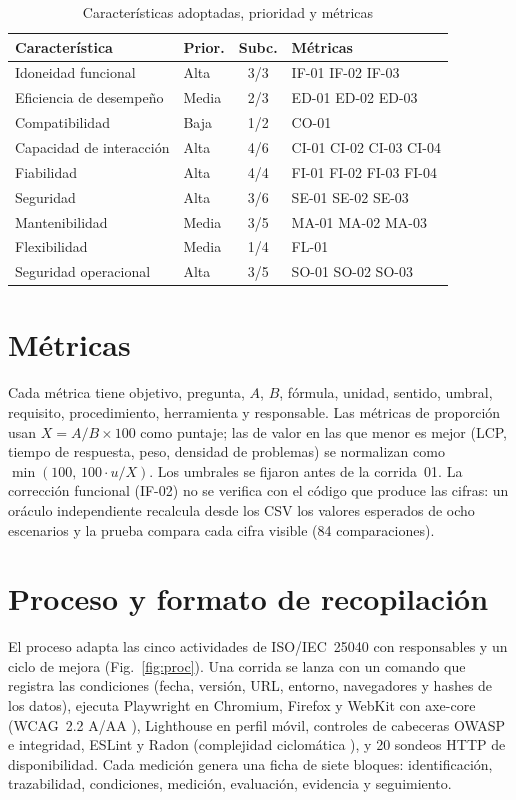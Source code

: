 \documentclass[conference,a4paper]{IEEEtran}
\begin{document}
\begin{table}[t]
\caption{Características adoptadas, prioridad y métricas}
\label{tab:car}
\centering\footnotesize
\begin{tabular}{@{}L{2.6cm}lcL{2.6cm}@{}}
\toprule
Característica & Prior. & Subc. & Métricas \\
\midrule
Idoneidad funcional & Alta & 3/3 & IF-01 IF-02 IF-03 \\
Eficiencia de desempeño & Media & 2/3 & ED-01 ED-02 ED-03 \\
Compatibilidad & Baja & 1/2 & CO-01 \\
Capacidad de interacción & Alta & 4/6 & CI-01 CI-02 CI-03 CI-04 \\
Fiabilidad & Alta & 4/4 & FI-01 FI-02 FI-03 FI-04 \\
Seguridad & Alta & 3/6 & SE-01 SE-02 SE-03 \\
Mantenibilidad & Media & 3/5 & MA-01 MA-02 MA-03 \\
Flexibilidad & Media & 1/4 & FL-01 \\
Seguridad operacional & Alta & 3/5 & SO-01 SO-02 SO-03 \\
\bottomrule
\end{tabular}
\end{table}

\section{Métricas}
Cada métrica tiene objetivo, pregunta, $A$, $B$, fórmula, unidad, sentido, umbral, requisito, procedimiento, herramienta y responsable. Las métricas de proporción usan $X=A/B\times100$ como puntaje; las de valor en las que menor es mejor (LCP, tiempo de respuesta, peso, densidad de problemas) se normalizan como $\min(100,\,100\cdot u/X)$. Los umbrales se fijaron antes de la corrida~01. La corrección funcional (IF-02) no se verifica con el código que produce las cifras: un oráculo independiente recalcula desde los CSV los valores esperados de ocho escenarios y la prueba compara cada cifra visible (84 comparaciones).

\section{Proceso y formato de recopilación}
El proceso adapta las cinco actividades de ISO/IEC~25040 con responsables y un ciclo de mejora (Fig.~\ref{fig:proc}). Una corrida se lanza con un comando que registra las condiciones (fecha, versión, URL, entorno, navegadores y hashes de los datos), ejecuta Playwright en Chromium, Firefox y WebKit con axe-core (WCAG~2.2 A/AA \cite{wcag}), Lighthouse en perfil móvil, controles de cabeceras OWASP \cite{owasp} e integridad, ESLint y Radon (complejidad ciclomática \cite{mccabe}), y 20 sondeos HTTP de disponibilidad. Cada medición genera una ficha de siete bloques: identificación, trazabilidad, condiciones, medición, evaluación, evidencia y seguimiento.
\end{document}
